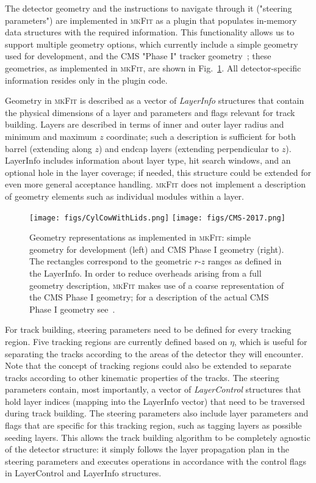 \documentclass[a4paper,11pt]{article}
\newcommand{\mkFit}{\textsc{mkFit}\xspace}
\begin{document}
The detector geometry and the instructions to navigate through it ("steering parameters") are implemented in \mkFit as a plugin that populates in-memory data structures with the required information. This functionality allows us to support multiple geometry options, which currently include a simple geometry used for development, and the CMS "Phase I" tracker geometry~\cite{CMS:2012sda}; these geometries, as implemented in \mkFit, are shown in Fig.~\ref{fig:geoms}. All detector-specific information resides only in the plugin code. 

Geometry in \mkFit is described as a vector of \emph{LayerInfo} structures that contain the physical dimensions of a layer and parameters and flags relevant for track building. 
Layers are described in terms of inner and outer layer radius and minimum and maximum $z$ coordinate; such a description is sufficient for both barrel (extending along $z$) and endcap layers (extending perpendicular to $z$).
LayerInfo includes information about layer type, %
hit search windows, and an optional hole in the layer coverage; if needed, this structure could be extended for even more general acceptance handling. \mkFit does not implement a description of geometry elements such as individual modules within a layer.

\begin{figure}[h]
\centering\texttt{[image: figs/CylCowWithLids.png]}
\centering\texttt{[image: figs/CMS-2017.png]}
\caption{Geometry representations as implemented in \mkFit: simple geometry for development (left) and CMS Phase I geometry (right). The rectangles correspond to the geometric $r$-$z$ ranges as defined in the LayerInfo. In order to reduce overheads arising from a full geometry description, \mkFit makes use of a coarse representation of the CMS Phase I geometry; for a description of the actual CMS Phase I geometry see~\cite{CMS:2012sda}.}
\label{fig:geoms}
\end{figure}

For track building, steering parameters need to be defined for every tracking region. 
Five tracking regions are currently defined based on $\eta$, which is useful for separating the tracks according to the areas of the detector they will encounter. Note that the concept of tracking regions could also be extended to separate tracks according to other kinematic properties of the tracks.
The steering parameters contain, most importantly, a vector of \emph{LayerControl} structures that hold layer indices (mapping into the LayerInfo vector) that need to be traversed during track building. The steering parameters also include layer parameters and flags that are specific for this tracking region, such as tagging layers as possible seeding layers. %
This allows the track building algorithm to be completely agnostic of the detector structure: it simply follows the layer propagation plan in the steering parameters and executes operations in accordance with the control flags in LayerControl and LayerInfo structures.
\end{document}
